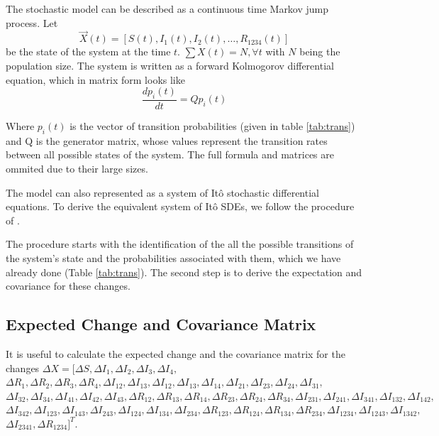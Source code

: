 \documentclass[12pt]{article}
\begin{document}
The stochastic model can be described as a continuous time Markov jump process. 
Let
$$\overrightarrow{X}(t) = [S(t), I_1(t), I_2(t), \ldots, R_{1234}(t)]$$ 
be the 
state of the system at the time $t$. $\sum X(t) = N, \forall t$ with $N$ being 
the population size. 
The system is written as a forward Kolmogorov differential equation, which in 
matrix form looks like
\begin{equation}
\frac{dp_i(t)}{dt} = Q p_i(t) 
\end{equation}

Where $p_i(t)$ is  the vector of transition probabilities (given in table 
\ref{tab:trans}) and Q is the generator matrix, whose  values represent the 
transition rates between all possible states of the system. The full formula 
and matrices are ommited due to their large sizes.

The model can also represented as a system of Itô stochastic differential 
equations. To derive the equivalent system of Itô SDEs, we follow the procedure 
of \citet{allen_modeling_2007}. 

The procedure starts with the identification of the all the possible 
transitions of the system's state and the probabilities associated with them, 
which we have already done (Table \ref{tab:trans}). The second step is to 
derive the expectation and covariance for these changes.

\subsection*{Expected Change and Covariance Matrix}

It is useful to calculate the expected change and the covariance matrix for the 
changes $\Delta X = [\Delta S, \Delta I_1, \Delta I_2, \Delta I_3, \Delta I_4,$
$\Delta R_1, \Delta R_2, \Delta R_3, \Delta R_4,\Delta I_{12}, \Delta I_{13},
\Delta I_{12}, \Delta I_{13}, 
\Delta I_{14}, \Delta I_{21}, \Delta I_{23}, \Delta I_{24}, \Delta I_{31},$
$\Delta I_{32}, 
\Delta I_{34}, \Delta I_{41}, \Delta I_{42}, \Delta I_{43}, \Delta R_{12}, 
\Delta R_{13}, \Delta R_{14}, \Delta R_{23}, \Delta R_{24}, \Delta R_{34},
\Delta I_{231}, \Delta I_{241}, \Delta I_{341}, \Delta I_{132}, \Delta I_{142},$
$\Delta I_{342}, \Delta I_{123}, \Delta I_{143}, \Delta I_{243}, \Delta I_{124},
\Delta I_{134}, \Delta I_{234}, \Delta R_{123}, \Delta R_{124}, \Delta R_{134},
\Delta R_{234}, \Delta I_{1234}, \Delta I_{1243}, \Delta I_{1342},$\\
$\Delta I_{2341},\Delta R_{1234}]^T$.
\end{document}
